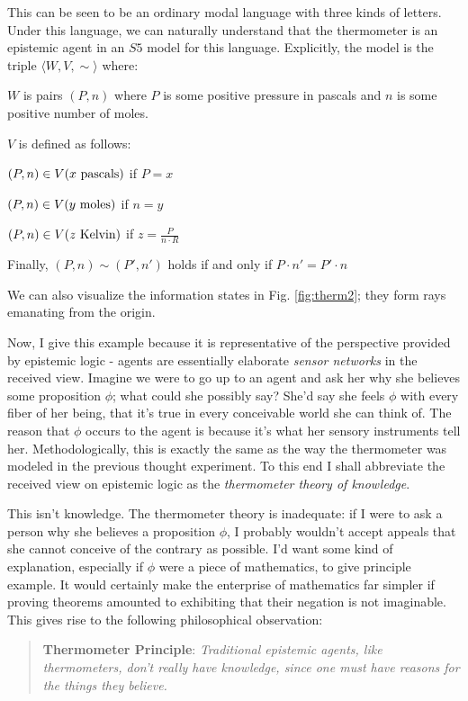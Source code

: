 \documentclass[11pt]{article}
\numberwithin{equation}{subsection}
\begin{document}
This can be seen to be an ordinary modal language with three kinds of letters.  Under this language, we can naturally understand that the thermometer is an epistemic agent in an $S5$ model for this language.  Explicitly, the model is the triple $\langle W, V, \sim \rangle$ where:
\begin{bul}
	\item $W$ is pairs $(P,n)$ where $P$ is some positive pressure in pascals and $n$ is some positive number of moles.
	\item $V$ is defined as follows:
	\begin{bul}
		\item $(P,n) \in V(x \textup{\ pascals})$ if $P = x$
		\item $(P,n) \in V(y \textup{\ moles})$ if $n = y$
		\item $(P,n) \in V(z \textup{\ Kelvin})$ if $z = \frac{P}{n \cdot R}$
	\end{bul}
	\item Finally, $(P,n) \sim (P',n')$ holds if and only if $P \cdot n' = P' \cdot n$ 
\end{bul}
We can also visualize the information states in Fig.  \ref{fig:therm2}; they form rays emanating from the origin.

Now, I give this example because it is representative of the perspective provided by epistemic logic - agents are essentially elaborate \emph{sensor networks} in the received view.  Imagine we were to go up to an agent and ask her why she believes some proposition $\phi$; what could she possibly say?  She'd say she feels $\phi$ with every fiber of her being, that it's true in every conceivable world she can think of.  The reason that $\phi$ occurs to the agent is because it's what her sensory instruments tell her. Methodologically, this is exactly the same as the way the thermometer was modeled in the previous thought experiment. To this end I shall abbreviate the received view on epistemic logic as the \emph{thermometer theory of knowledge}.

This isn't knowledge.  The thermometer theory is inadequate:  if I were to ask a person why she believes a proposition $\phi$, I probably wouldn't accept appeals that she cannot conceive of the contrary as possible.  I'd want some kind of explanation, especially if $\phi$ were a piece of mathematics, to give principle example.  It would certainly make the enterprise of mathematics far simpler if proving theorems amounted to exhibiting that their negation is not imaginable.  This gives rise to the following philosophical observation:
\begin{quote}
\textbf{Thermometer Principle}: \emph{Traditional epistemic agents, like thermometers, don't really have knowledge, since one must have reasons for the things they believe.}
\end{quote}
\end{document}
